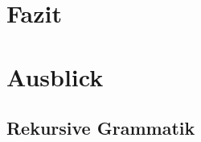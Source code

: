 \documentclass[../InterneDSLs.tex]{subfiles}
\begin{document}
\chapter{Fazit}

\chapter{Ausblick}
\section{Rekursive Grammatik}
\end{document}
